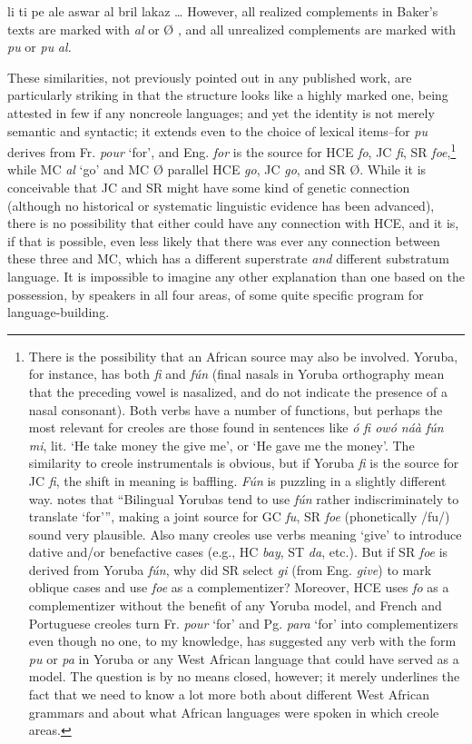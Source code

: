 \ea\label{ex:2:38}
 li ti pe ale aswar al bril lakaz \ldots 
\z
However, all realized complements in Baker's texts are marked with \textit{al} or {\O} , and all unrealized complements are marked with \textit{pu} or \textit{pu} \textit{al.}

These similarities, not previously pointed out in any published work, are particularly striking in that the structure looks like a highly marked one, being attested in few if any noncreole languages; and yet the identity is not merely semantic and syntactic; it extends even to the choice of lexical items--for \textit{pu} derives from Fr. \textit{pour} `for', and Eng. \textit{for} is the source for HCE \textit{fo}, JC \textit{fi}, SR \textit{foe},\footnote{There is the possibility that an African source may also be involved. Yoruba, for instance, has both \textit{fi} and \textit{f{\'u}n} (final nasals in Yoruba orthography mean that the preceding vowel is nasalized, and do not indicate the presence of a nasal consonant). Both verbs have a number of functions, but perhaps the most relevant for creoles are those found in sentences like \textit{{\'o} fi ow{\'o} n\'a\`a f\'un mi}, lit. `He take money the give me', or `He gave me the money'. The similarity to creole instrumentals is obvious, but if Yoruba \textit{fi} is the source for JC \textit{fi}, the shift in meaning is baffling. \textit{F\'un} is puzzling in a slightly different way. \citet{Rowlands1969} notes that ``Bilingual Yorubas tend to use \textit{f\'un} rather indiscriminately to translate `for''', making a joint source for GC \textit{fu}, SR \textit{foe} (phonetically /fu/) sound very plausible. Also many creoles use %
verbs meaning `give' to introduce dative and/or benefactive cases (e.g., HC \textit{bay}, ST \textit{da}, etc.). But if SR \textit{foe} is derived from Yoruba \textit{f\'un}, why did SR select \textit{gi} (from Eng. \textit{give}) to mark oblique cases and use \textit{foe} as a complementizer? Moreover, HCE uses \textit{fo} as a complementizer without the benefit of any Yoruba model, and French and Portuguese creoles turn Fr. \textit{pour} `for' and Pg. \textit{para} `for' into complementizers even though no one, to my knowledge, has suggested any verb with the form \textit{pu} or \textit{pa} in Yoruba or any West African language that could have served as a model. The question is by no means closed, however; it merely underlines the fact that we need to know a lot more both about different West African grammars and about what African lan\-guages were spoken in which creole areas.} while MC \textit{al} `go' and MC {\O} parallel HCE \textit{go}, JC \textit{go}, and SR {\O}. While it is conceivable that JC and SR might have some kind of genetic connection (although no historical or systematic linguistic evidence has been advanced), there is no possi\-bility that either could have any connection with HCE, and it is, if that is possible, even less likely that there was ever any connection between these three and MC, which has a different superstrate \textit{and} different substratum language. It is impossible to imagine any other
explanation than one based on the possession, by speakers in all four areas, of some quite specific program for language-building.

